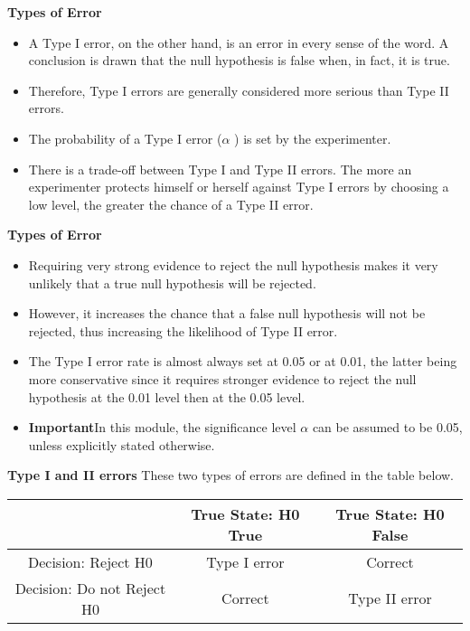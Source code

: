 \noindent \textbf{Types of Error}
\large
\begin{itemize}
\item
A Type I error, on the other hand, is an error in every sense of the word. A conclusion is drawn that the null hypothesis is false when, in fact, it is true. \item Therefore, Type I errors are generally considered more serious than Type II errors.
\item
The probability of a Type I error ($\alpha$ ) is set by the experimenter. \item There is a trade-off between Type I and Type II errors. The more an experimenter protects himself or herself against Type I errors by choosing a low level, the greater the chance of a Type II error.
\end{itemize}


\noindent \textbf{Types of Error}
\large
\begin{itemize}
\item
Requiring very strong evidence to reject the null hypothesis makes it very unlikely that a true null hypothesis will be rejected. \item However, it increases the chance that a false null hypothesis will not be rejected, thus increasing the likelihood of Type II error.
\item
The Type I error rate is almost always set at 0.05 or at 0.01, the latter being more conservative since it requires stronger evidence to reject the null hypothesis at the 0.01 level then at the 0.05 level.
\item \textbf{Important}In this module, the significance level $\alpha$ can be assumed to be 0.05, unless explicitly stated otherwise.
\end{itemize}


\noindent \textbf{Type I and II errors}
\large
These two types of errors are defined in the table below.
\small
\begin{center}
\begin{tabular}{|c|c|c|}
\hline
&True State: H0 True & True State: H0 False\\\hline
Decision: Reject H0 & Type I error& Correct\\\hline
Decision: Do not Reject H0 & Correct &Type II error\\ \hline
\end{tabular}
\end{center}



